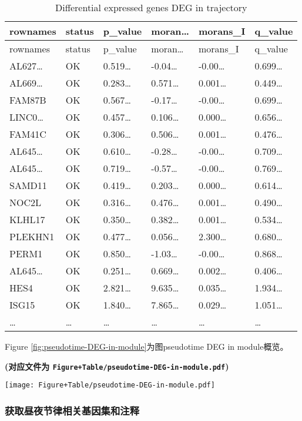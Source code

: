 \documentclass[
]{article}
\begin{document}
\begin{longtable}[]{@{}llllll@{}}
\caption{\label{tab:differential-expressed-genes-DEG-in-trajectory}Differential expressed genes DEG in trajectory}\tabularnewline
\toprule
rownames & status & p\_value & moran\ldots{} & morans\_I & q\_value\tabularnewline
\midrule
\endfirsthead
\toprule
rownames & status & p\_value & moran\ldots{} & morans\_I & q\_value\tabularnewline
\midrule
\endhead
AL627\ldots{} & OK & 0.519\ldots{} & -0.04\ldots{} & -0.00\ldots{} & 0.699\ldots{}\tabularnewline
AL669\ldots{} & OK & 0.283\ldots{} & 0.571\ldots{} & 0.001\ldots{} & 0.449\ldots{}\tabularnewline
FAM87B & OK & 0.567\ldots{} & -0.17\ldots{} & -0.00\ldots{} & 0.699\ldots{}\tabularnewline
LINC0\ldots{} & OK & 0.457\ldots{} & 0.106\ldots{} & 0.000\ldots{} & 0.656\ldots{}\tabularnewline
FAM41C & OK & 0.306\ldots{} & 0.506\ldots{} & 0.001\ldots{} & 0.476\ldots{}\tabularnewline
AL645\ldots{} & OK & 0.610\ldots{} & -0.28\ldots{} & -0.00\ldots{} & 0.709\ldots{}\tabularnewline
AL645\ldots{} & OK & 0.719\ldots{} & -0.57\ldots{} & -0.00\ldots{} & 0.769\ldots{}\tabularnewline
SAMD11 & OK & 0.419\ldots{} & 0.203\ldots{} & 0.000\ldots{} & 0.614\ldots{}\tabularnewline
NOC2L & OK & 0.316\ldots{} & 0.476\ldots{} & 0.001\ldots{} & 0.490\ldots{}\tabularnewline
KLHL17 & OK & 0.350\ldots{} & 0.382\ldots{} & 0.001\ldots{} & 0.534\ldots{}\tabularnewline
PLEKHN1 & OK & 0.477\ldots{} & 0.056\ldots{} & 2.300\ldots{} & 0.680\ldots{}\tabularnewline
PERM1 & OK & 0.850\ldots{} & -1.03\ldots{} & -0.00\ldots{} & 0.868\ldots{}\tabularnewline
AL645\ldots{} & OK & 0.251\ldots{} & 0.669\ldots{} & 0.002\ldots{} & 0.406\ldots{}\tabularnewline
HES4 & OK & 2.821\ldots{} & 9.635\ldots{} & 0.035\ldots{} & 1.934\ldots{}\tabularnewline
ISG15 & OK & 1.840\ldots{} & 7.865\ldots{} & 0.029\ldots{} & 1.051\ldots{}\tabularnewline
\ldots{} & \ldots{} & \ldots{} & \ldots{} & \ldots{} & \ldots{}\tabularnewline
\bottomrule
\end{longtable}

Figure \ref{fig:pseudotime-DEG-in-module}为图pseudotime DEG in module概览。

\textbf{(对应文件为 \texttt{Figure+Table/pseudotime-DEG-in-module.pdf})}

\def\@captype{figure}
\begin{center}
\texttt{[image: Figure+Table/pseudotime-DEG-in-module.pdf]}
\caption{Pseudotime DEG in module}\label{fig:pseudotime-DEG-in-module}
\end{center}

\hypertarget{ux83b7ux53d6ux663cux591cux8282ux5f8bux76f8ux5173ux57faux56e0ux96c6ux548cux6ce8ux91ca}{%
\subsubsection{获取昼夜节律相关基因集和注释}\label{ux83b7ux53d6ux663cux591cux8282ux5f8bux76f8ux5173ux57faux56e0ux96c6ux548cux6ce8ux91ca}}
\end{document}
